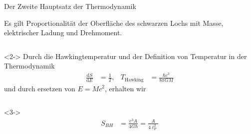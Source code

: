 \documentclass[ngerman,ph]{URbeamer}
\newcommand{\diff}{\mathrm{d}}
\begin{document}
	\begin{frame}{Der Zweite Hauptsatz der Thermodynamik}
		\begin{block}{}
		Es gilt Proportionalität der Oberfläche des schwarzen Lochs mit Masse, elektrischer Ladung und Drehmoment.
		\end{block}
		\vfill
		\begin{columns}
			\begin{column}{\textwidth}<2->
			Durch die Hawkingtemperatur und der Definition von Temperatur in der Thermodynamik
			\begin{align*}
				\frac{\diff S}{\diff E} &= \frac{1}{T},&
				T_{\text{Hawking}} &= \frac{\hbar c^3}{8 \pi G M}
			\end{align*}
			und durch ersetzen von $E = Mc^2$, erhalten wir
			\end{column}
		\end{columns} 
		\begin{columns}
			\begin{column}{\textwidth}<3->
			\begin{align*}
				S_{BH} &= \frac{c^3 A}{4 G \hbar} = \frac{A}{4 \ell_{\mathrm{P}}^2} 
			\end{align*}
			\end{column}
		\end{columns}
	\end{frame}
	
\end{document}
